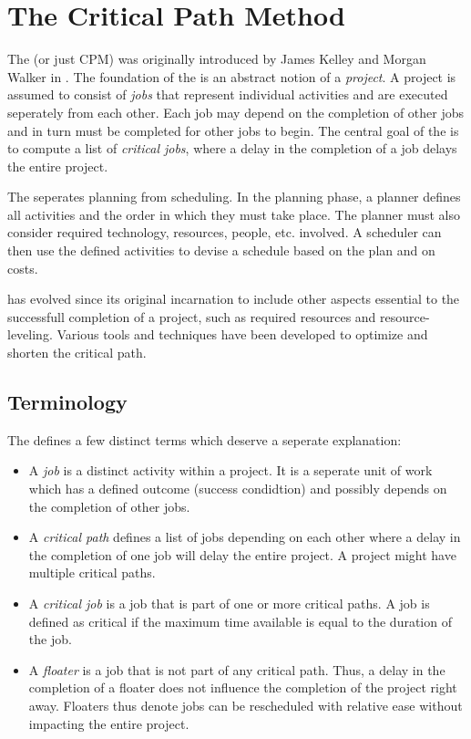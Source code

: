 \section{The Critical Path Method}

The \cpm{} (or just CPM) was originally introduced by James Kelley and Morgan Walker in
\cite{Kelley:1959:CPS:1460299.1460318}. The foundation of the \cpm{} is an abstract notion of a
\emph{project}. A project is assumed to consist of \emph{jobs} that represent individual activities
and are executed seperately from each other. Each job may depend on the completion of other jobs and
in turn must be completed for other jobs to begin. The central goal of the \cpm{} is to compute a list
of \emph{critical jobs}, where a delay in the completion of a job delays the entire project.

The \cpm{} seperates planning from scheduling. In the planning phase, a planner defines all
activities and the order in which they must take place. The planner must also consider required 
technology, resources, people, etc. involved. A scheduler can then use the defined activities to
devise a schedule based on the plan and on costs\cite[p. 161]{Kelley:1959:CPS:1460299.1460318}.

\cpm{} has evolved since its original incarnation to include other aspects essential to the
successfull completion of a project, such as required resources and resource-leveling. Various tools
and techniques have been developed to optimize and shorten the critical path.

\subsection{Terminology}
The \cpm{} defines a few distinct terms which deserve a seperate explanation:
\begin{itemize}
  \item A \emph{job} is a distinct activity within a project. It is a seperate unit of work which
  has a defined outcome (success condidtion) and possibly depends on the completion of other jobs.
  \item A \emph{critical path} defines a list of jobs depending on each other where a delay in the
  completion of one job will delay the entire project. A project might have multiple critical paths.
  \item A \emph{critical job} is a job that is part of one or more critical paths. A job is defined
  as critical if the maximum time available is equal to the duration of the job\cite[p.
  163]{Kelley:1959:CPS:1460299.1460318}.
  \item A \emph{floater} is a job that is not part of any critical path. Thus, a delay in the
  completion of a floater does not influence the completion of the project right away. Floaters thus
  denote jobs can be rescheduled with relative ease without impacting the entire project.
\end{itemize}

